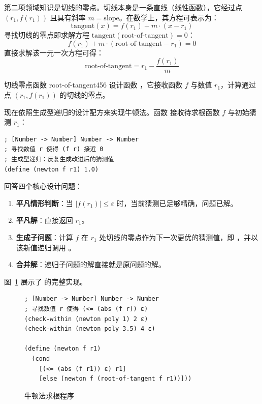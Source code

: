第二项领域知识是切线的零点。切线本身是一条直线（线性函数），它经过点 $(r_1, f(r_1))$ 且具有斜率 $m = \text{slope}$。在数学上，其方程可表示为：
\[ \text{tangent}(x) = f(r_1) + m \cdot (x - r_1) \]
寻找切线的零点即求解方程 $\text{tangent}(\text{root-of-tangent}) = 0$：
\[ f(r_1) + m \cdot (\text{root-of-tangent} - r_1) = 0 \]
直接求解该一元一次方程可得：
\[ \text{root-of-tangent} = r_1 - \frac{f(r_1)}{m} \]

\begin{exercise}{切线零点函数 root-of-tangent}{456}\label{ex:456}
设计函数 ，它接收函数 $f$ 与数值 $r_1$，计算通过点 $(r_1, f(r_1))$ 的切线的零点。
\end{exercise}

现在依照生成型递归的设计配方来实现牛顿法。函数  接收待求根函数 $f$ 与初始猜测 $r_1$：

\begin{lstlisting}[language=BSL]
; [Number -> Number] Number -> Number
; 寻找数值 r 使得 (f r) 接近 0
; 生成型递归：反复生成改进后的猜测值
(define (newton f r1) 1.0)
\end{lstlisting}

回答四个核心设计问题：
\begin{enumerate}
  \item \textbf{平凡情形判断}：当 $|f(r_1)| \le \varepsilon$ 时，当前猜测已足够精确，问题已解。
  \item \textbf{平凡解}：直接返回 $r_1$。
  \item \textbf{生成子问题}：计算 $f$ 在 $r_1$ 处切线的零点作为下一次更优的猜测值，即 ，并以该新值递归调用 。
  \item \textbf{合并解}：递归子问题的解直接就是原问题的解。
\end{enumerate}

图~\ref{fig:newton-code} 展示了  的完整实现。

\begin{figure}[htbp]
  \centering
\begin{lstlisting}[language=BSL]
; [Number -> Number] Number -> Number
; 寻找数值 r 使得 (<= (abs (f r)) ε)
(check-within (newton poly 1) 2 ε)
(check-within (newton poly 3.5) 4 ε)

(define (newton f r1)
  (cond
    [(<= (abs (f r1)) ε) r1]
    [else (newton f (root-of-tangent f r1))]))
\end{lstlisting}
  \caption{牛顿法求根程序}
  \label{fig:newton-code}
\end{figure}


